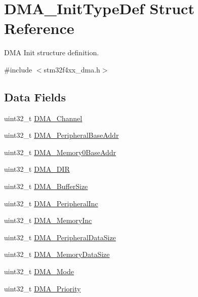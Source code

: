\hypertarget{struct_d_m_a___init_type_def}{}\section{D\+M\+A\+\_\+\+Init\+Type\+Def Struct Reference}
\label{struct_d_m_a___init_type_def}


D\+MA Init structure definition.  




{\ttfamily \#include $<$stm32f4xx\+\_\+dma.\+h$>$}

\subsection*{Data Fields}
\begin{DoxyCompactItemize}
\item 
uint32\+\_\+t \hyperlink{struct_d_m_a___init_type_def_afae070f2d49543b1acd3e318c6de8527}{D\+M\+A\+\_\+\+Channel}
\item 
uint32\+\_\+t \hyperlink{struct_d_m_a___init_type_def_ad02abd574cca0caeacd0cc05d2174a42}{D\+M\+A\+\_\+\+Peripheral\+Base\+Addr}
\item 
uint32\+\_\+t \hyperlink{struct_d_m_a___init_type_def_aebf1267410908265f83a8037245c337e}{D\+M\+A\+\_\+\+Memory0\+Base\+Addr}
\item 
uint32\+\_\+t \hyperlink{struct_d_m_a___init_type_def_a4cf4283185065f65d5a63089877cbb8d}{D\+M\+A\+\_\+\+D\+IR}
\item 
uint32\+\_\+t \hyperlink{struct_d_m_a___init_type_def_ad5e4b9069a7a145b3312d54d09059f78}{D\+M\+A\+\_\+\+Buffer\+Size}
\item 
uint32\+\_\+t \hyperlink{struct_d_m_a___init_type_def_ad0bf5e8b3968eaf8dc18e923b94acfe1}{D\+M\+A\+\_\+\+Peripheral\+Inc}
\item 
uint32\+\_\+t \hyperlink{struct_d_m_a___init_type_def_ad8f8a0f3ba4db5d79fd78d02093e4eb9}{D\+M\+A\+\_\+\+Memory\+Inc}
\item 
uint32\+\_\+t \hyperlink{struct_d_m_a___init_type_def_a61bf939d8657d44a9beb1daa91c14668}{D\+M\+A\+\_\+\+Peripheral\+Data\+Size}
\item 
uint32\+\_\+t \hyperlink{struct_d_m_a___init_type_def_a7ec1648d136d31d6c504565bf6949eb6}{D\+M\+A\+\_\+\+Memory\+Data\+Size}
\item 
uint32\+\_\+t \hyperlink{struct_d_m_a___init_type_def_a5f09c16a03a50120c1a1a49ae6a7c667}{D\+M\+A\+\_\+\+Mode}
\item 
uint32\+\_\+t \hyperlink{struct_d_m_a___init_type_def_aabb62e3f5536fc15a201058a1b6bda18}{D\+M\+A\+\_\+\+Priority}

\end{DoxyCompactItemize}
